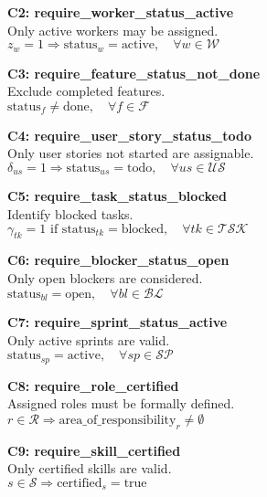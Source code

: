 \documentclass[12pt]{article}
\begin{document}
    \item \textbf{C2: require\_worker\_status\_active} \\
    Only active workers may be assigned. \\
    $ z_w = 1 \Rightarrow \text{status}_w = \text{active}, \quad \forall w \in \mathcal{W} $

    \item \textbf{C3: require\_feature\_status\_not\_done} \\
    Exclude completed features. \\
    $ \text{status}_f \neq \text{done}, \quad \forall f \in \mathcal{F} $

    \item \textbf{C4: require\_user\_story\_status\_todo} \\
    Only user stories not started are assignable. \\
    $ \delta_{us} = 1 \Rightarrow \text{status}_{us} = \text{todo}, \quad \forall us \in \mathcal{US} $

    \item \textbf{C5: require\_task\_status\_blocked} \\
    Identify blocked tasks. \\
    $ \gamma_{tk} = 1 \text{ if } \text{status}_{tk} = \text{blocked}, \quad \forall tk \in \mathcal{TSK} $

    \item \textbf{C6: require\_blocker\_status\_open} \\
    Only open blockers are considered. \\
    $ \text{status}_{bl} = \text{open}, \quad \forall bl \in \mathcal{BL} $

    \item \textbf{C7: require\_sprint\_status\_active} \\
    Only active sprints are valid. \\
    $ \text{status}_{sp} = \text{active}, \quad \forall sp \in \mathcal{SP} $

    \item \textbf{C8: require\_role\_certified} \\
    Assigned roles must be formally defined. \\
    $ r \in \mathcal{R} \Rightarrow \text{area\_of\_responsibility}_r \neq \emptyset $

    \item \textbf{C9: require\_skill\_certified} \\
    Only certified skills are valid. \\
    $ s \in \mathcal{S} \Rightarrow \text{certified}_s = \text{true} $
\end{document}
